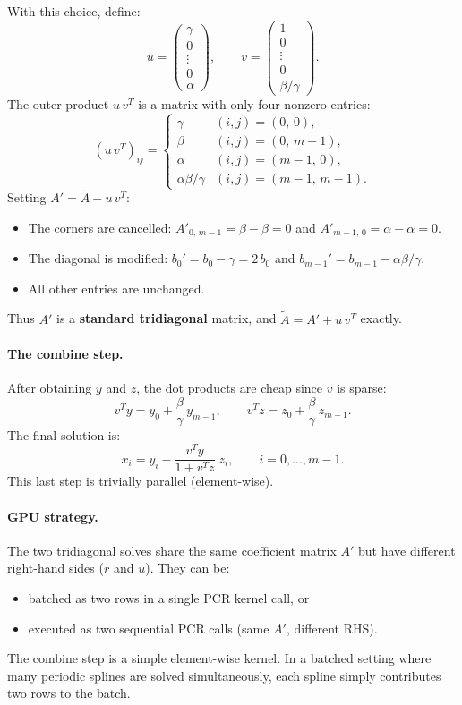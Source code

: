 \documentclass[11pt]{article}
\begin{document}
With this choice, define:
\[
u = \begin{pmatrix} \gamma \\ 0 \\ \vdots \\ 0 \\ \alpha \end{pmatrix},
\qquad
v = \begin{pmatrix} 1 \\ 0 \\ \vdots \\ 0 \\ \beta/\gamma \end{pmatrix}.
\]
The outer product $u\,v^T$ is a matrix with only four nonzero entries:
\[
(u\,v^T)_{ij} =
\begin{cases}
\gamma            & (i,j) = (0,\,0), \\
\beta             & (i,j) = (0,\,m{-}1), \\
\alpha            & (i,j) = (m{-}1,\,0), \\
\alpha\beta/\gamma & (i,j) = (m{-}1,\,m{-}1).
\end{cases}
\]
Setting $A' = \tilde{A} - u\,v^T$:
\begin{itemize}
\item The corners are cancelled:
  $A'_{0,\,m-1} = \beta - \beta = 0$ and
  $A'_{m-1,\,0} = \alpha - \alpha = 0$.
\item The diagonal is modified:
  $b_0' = b_0 - \gamma = 2\,b_0$ and
  $b_{m-1}' = b_{m-1} - \alpha\beta/\gamma$.
\item All other entries are unchanged.
\end{itemize}
Thus $A'$ is a \textbf{standard tridiagonal} matrix, and
$\tilde{A} = A' + u\,v^T$ exactly.

\paragraph{The combine step.}
After obtaining $y$ and $z$, the dot products are cheap since $v$
is sparse:
\[
v^T y = y_0 + \frac{\beta}{\gamma}\,y_{m-1},
\qquad
v^T z = z_0 + \frac{\beta}{\gamma}\,z_{m-1}.
\]
The final solution is:
\[
x_i = y_i - \frac{v^T y}{1 + v^T z}\; z_i,
\qquad i = 0, \ldots, m{-}1.
\]
This last step is trivially parallel (element-wise).

\paragraph{GPU strategy.}
The two tridiagonal solves share the same coefficient matrix $A'$
but have different right-hand sides ($r$ and $u$). They can be:
\begin{itemize}
\item batched as two rows in a single PCR kernel call, or
\item executed as two sequential PCR calls (same $A'$, different RHS).
\end{itemize}
The combine step is a simple element-wise kernel. In a batched
setting where many periodic splines are solved simultaneously,
each spline simply contributes two rows to the batch.
\end{document}

